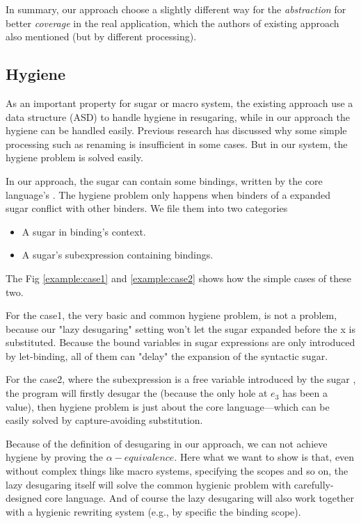In summary, our approach choose a slightly different way for the \emph{abstraction} for better \emph{coverage} in the real application, which the authors of existing approach also mentioned (but by different processing).


\subsection{Hygiene}

As an important property for sugar or macro system, the existing approach use a data structure (ASD) to handle hygiene in resugaring, while in our approach the hygiene can be handled easily. Previous research\cite{EssenceofHygiene} has discussed why some simple processing such as renaming is insufficient in some cases. But in our system, the hygiene problem is solved easily. 

In our approach, the sugar can contain some bindings, written by the core language's . The hygiene problem only happens when binders of a expanded sugar conflict with other binders. We file them into two categories
\begin{itemize}
\item A sugar in binding's context.
\item A sugar's subexpression containing bindings.
\end{itemize}
The Fig \ref{example:case1} and \ref{example:case2} shows how the simple cases of these two.


For the case1, the very basic and common hygiene problem, is not a problem, because our "lazy desugaring" setting won't let the sugar  expanded before the x is substituted. Because the bound variables in sugar expressions are only introduced by let-binding, all of them can "delay" the expansion of the syntactic sugar.

For the case2, where the subexpression  is a free variable introduced by the sugar , the program will firstly desugar the  (because the only hole at $e_3$ has been a value), then hygiene problem is just about the core language---which can be easily solved by capture-avoiding substitution.

Because of the definition of desugaring in our approach, we can not achieve hygiene by proving the $\alpha-equivalence$.
Here what we want to show is that, even without complex things like macro systems, specifying the scopes and so on, the lazy desugaring itself will solve the common hygienic problem with carefully-designed core language. And of course the lazy desugaring will also work together with a hygienic rewriting system (e.g., by specific the binding scope).
